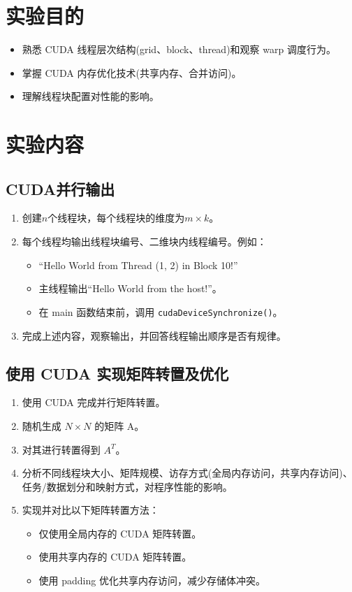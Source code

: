 \documentclass{SYSUReport}
\date{\today}
\begin{document}
\cover
\thispagestyle{empty}
\clearpage

\section{实验目的}
\begin{itemize}
   \item 熟悉 CUDA 线程层次结构(grid、block、thread)和观察 warp 调度行为。
   \item 掌握 CUDA 内存优化技术(共享内存、合并访问)。
   \item 理解线程块配置对性能的影响。
\end{itemize}

\section{实验内容}
\subsection{CUDA并行输出}
\begin{enumerate}
    \item 创建$n$个线程块，每个线程块的维度为$m\times k$。
    \item 每个线程均输出线程块编号、二维块内线程编号。例如：
    \begin{itemize}
        \item “Hello World from Thread (1, 2) in Block 10!”
        \item 主线程输出“Hello World from the host!”。
        \item 在 main 函数结束前，调用 \texttt{cudaDeviceSynchronize()}。
    \end{itemize}
    \item 完成上述内容，观察输出，并回答线程输出顺序是否有规律。
\end{enumerate}

\subsection{使用 CUDA 实现矩阵转置及优化}
\begin{enumerate}
    \item 使用 CUDA 完成并行矩阵转置。
    \item 随机生成 $N \times N$ 的矩阵 A。
    \item 对其进行转置得到 $A^T$。
    \item 分析不同线程块大小、矩阵规模、访存方式(全局内存访问，共享内存访问)、任务/数据划分和映射方式，对程序性能的影响。
    \item 实现并对比以下矩阵转置方法：
    \begin{itemize}
        \item 仅使用全局内存的 CUDA 矩阵转置。
        \item 使用共享内存的 CUDA 矩阵转置。
        \item 使用 padding 优化共享内存访问，减少存储体冲突。
    \end{itemize}
\end{enumerate}
\end{document}
